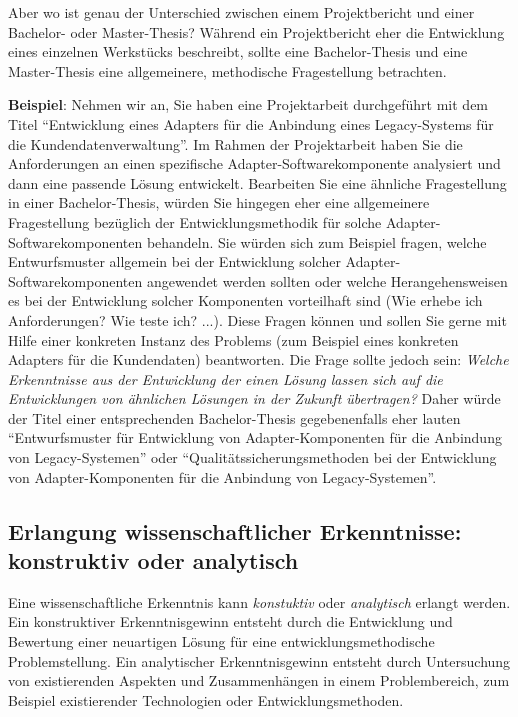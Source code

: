 Aber wo ist genau der Unterschied zwischen einem Projektbericht und einer Bachelor- oder Master-Thesis?
Während ein Projektbericht eher die Entwicklung eines einzelnen Werkstücks beschreibt, sollte eine Bachelor-Thesis und eine Master-Thesis eine allgemeinere, methodische Fragestellung betrachten. 

\textbf{Beispiel}: Nehmen wir an, Sie haben eine Projektarbeit durchgeführt mit dem Titel \enquote{Entwicklung eines Adapters für die Anbindung eines Legacy-Systems für die Kundendatenverwaltung}. Im Rahmen der Projektarbeit haben Sie die Anforderungen an einen spezifische Adapter-Softwarekomponente analysiert und dann eine passende Lösung entwickelt. Bearbeiten Sie eine ähnliche Fragestellung in einer Bachelor-Thesis, würden Sie hingegen eher eine allgemeinere Fragestellung bezüglich der Entwicklungsmethodik für solche Adapter-Softwarekomponenten behandeln. Sie würden sich zum Beispiel fragen, welche Entwurfsmuster  allgemein bei der Entwicklung solcher Adapter-Softwarekomponenten angewendet werden sollten oder welche Herangehensweisen es bei der Entwicklung solcher Komponenten vorteilhaft sind (Wie erhebe ich Anforderungen? Wie teste ich? ...). Diese Fragen können und sollen Sie gerne mit Hilfe einer konkreten Instanz des Problems (zum Beispiel eines konkreten Adapters für die Kundendaten) beantworten. Die Frage sollte jedoch sein: \textit{Welche Erkenntnisse aus der Entwicklung der einen Lösung lassen sich auf die Entwicklungen von ähnlichen Lösungen in der Zukunft übertragen?} Daher würde der Titel einer entsprechenden Bachelor-Thesis gegebenenfalls eher lauten \enquote{Entwurfsmuster für Entwicklung von Adapter-Komponenten für die Anbindung von Legacy-Systemen} oder \enquote{Qualitätssicherungsmethoden bei der Entwicklung von Adapter-Komponenten für die Anbindung von Legacy-Systemen}.

\subsection{Erlangung wissenschaftlicher Erkenntnisse: konstruktiv oder analytisch}

Eine wissenschaftliche Erkenntnis kann \textit{konstuktiv} oder \textit{analytisch} erlangt werden. 
Ein konstruktiver Erkenntnisgewinn entsteht durch die Entwicklung und Bewertung einer neuartigen Lösung für eine entwicklungsmethodische Problemstellung.
Ein analytischer Erkenntnisgewinn entsteht durch Untersuchung von existierenden Aspekten und Zusammenhängen in einem Problembereich, zum Beispiel existierender Technologien oder Entwicklungsmethoden.

